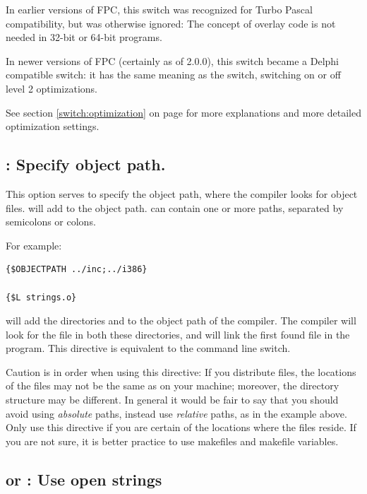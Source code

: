 In earlier versions of FPC, this switch was recognized for Turbo Pascal 
compatibility, but was otherwise ignored: The concept of overlay code 
is not needed in 32-bit or 64-bit programs.

In newer versions of FPC (certainly as of 2.0.0), this switch became a
Delphi compatible switch: it has the same meaning as the
 switch, switching on or off level 2 optimizations.

See section \ref{switch:optimization} on page \pageref{switch:optimization}
for more explanations and more detailed optimization settings.

\subsection{ : Specify object path.}

This option serves to specify the object path, where the compiler looks for
object files.  will add  to the object
path.  can contain one or more paths, separated by semicolons or
colons.

For example:
\begin{verbatim}
{$OBJECTPATH ../inc;../i386}

{$L strings.o}
\end{verbatim}

will add the directories  and  to the
object path of the compiler. The compiler will look for the file 
in both these directories, and will link the first found file in the
program. This directive is equivalent to the  command line switch.

Caution is in order when using this directive: If you distribute files, the
locations of the files may not be the same as on your machine; moreover, the
directory structure may be different. In general it would be fair to say
that you should avoid using {\em absolute} paths, instead use {\em relative}
paths, as in the example above. Only use this directive if you are certain
of the locations where the files reside. If you are not sure, it is better
practice to use makefiles and makefile variables.

\subsection{ or  : Use open strings}

